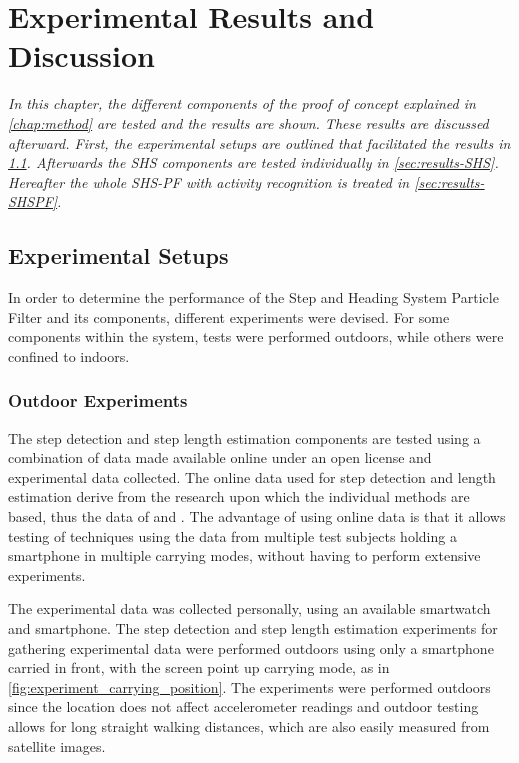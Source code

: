 \chapter{Experimental Results and Discussion}

\textit{In this chapter, the different components of the proof of concept explained in \cref{chap:method} are tested and the results are shown. These results are discussed afterward. First, the experimental setups are outlined that facilitated the results in \cref{sec:results-experimental setup}. Afterwards the \ac{SHS} components are tested individually in \cref{sec:results-SHS}. Hereafter the whole SHS-PF with activity recognition is treated in \cref{sec:results-SHSPF}.}

\section{Experimental Setups}
\label{sec:results-experimental setup}
In order to determine the performance of the Step and Heading System Particle Filter and its components, different experiments were devised. For some components within the system, tests were performed outdoors, while others were confined to indoors. \par 

\subsection{Outdoor Experiments}
The step detection and step length estimation components are tested using a combination of data made available online under an open license and experimental data collected. The online data used for step detection and length estimation derive from the research upon which the individual methods are based, thus the data of \citet{Salvi2018} and \citet{Vezocnik2019}. The advantage of using online data is that it allows testing of techniques using the data from multiple test subjects holding a smartphone in multiple carrying modes, without having to perform extensive experiments.  \par 

The experimental data was collected personally, using an available smartwatch and smartphone. The step detection and step length estimation experiments for gathering experimental data were performed outdoors using only a smartphone carried in front, with the screen point up carrying mode, as in \cref{fig:experiment_carrying_position}. The experiments were performed outdoors since the location does not affect accelerometer readings and outdoor testing allows for long straight walking distances, which are also easily measured from satellite images.\par 

